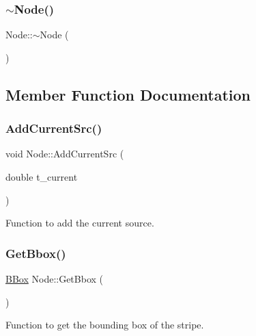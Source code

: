 \mbox{\label{classNode_aa0840c3cb5c7159be6d992adecd2097c}} 
\subsubsection{\texorpdfstring{$\sim$\+Node()}{~Node()}}
{\footnotesize\ttfamily Node\+::$\sim$\+Node (\begin{DoxyParamCaption}{ }\end{DoxyParamCaption})\hspace{0.3cm}{\ttfamily [inline]}}



\subsection{Member Function Documentation}
\mbox{\label{classNode_a252ea83ae41b143c652701749de63199}} 
\subsubsection{\texorpdfstring{Add\+Current\+Src()}{AddCurrentSrc()}}
{\footnotesize\ttfamily void Node\+::\+Add\+Current\+Src (\begin{DoxyParamCaption}\item[{double}]{t\+\_\+current }\end{DoxyParamCaption})}



Function to add the current source. 

\mbox{\label{classNode_a4a5391ab70a61e5bf4d2daef056a434c}} 
\subsubsection{\texorpdfstring{Get\+Bbox()}{GetBbox()}}
{\footnotesize\ttfamily \hyperlink{node_8h_acf0ff4a0bb7e0c9b5900382cbd2aa614}{B\+Box} Node\+::\+Get\+Bbox (\begin{DoxyParamCaption}{ }\end{DoxyParamCaption})}



Function to get the bounding box of the stripe. 

